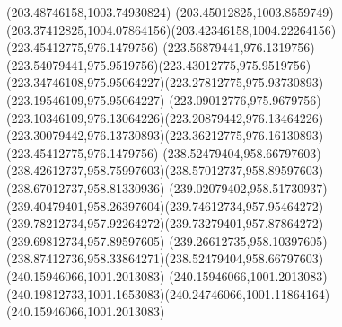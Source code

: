 {{		\lineto(203.48746158,1003.74930824)
		\curveto(203.45012825,1003.8559749)(203.37412825,1004.07864156)(203.42346158,1004.22264156)
		\moveto(223.45412775,976.1479756)
		\curveto(223.56879441,976.1319756)(223.54079441,975.9519756)(223.43012775,975.9519756)
		\curveto(223.34746108,975.95064227)(223.27812775,975.93730893)(223.19546109,975.95064227)
		\curveto(223.09012776,975.9679756)(223.10346109,976.13064226)(223.20879442,976.13464226)
		\curveto(223.30079442,976.13730893)(223.36212775,976.16130893)(223.45412775,976.1479756)
		\moveto(238.52479404,958.66797603)
		\curveto(238.42612737,958.75997603)(238.57012737,958.89597603)(238.67012737,958.81330936)
		\curveto(239.02079402,958.51730937)(239.40479401,958.26397604)(239.74612734,957.95464272)
		\curveto(239.78212734,957.92264272)(239.73279401,957.87864272)(239.69812734,957.89597605)
		\curveto(239.26612735,958.10397605)(238.87412736,958.33864271)(238.52479404,958.66797603)
		\moveto(240.15946066,1001.2013083)
		\lineto(240.15946066,1001.2013083)
		\curveto(240.19812733,1001.1653083)(240.24746066,1001.11864164)(240.15946066,1001.2013083)
	}
}
